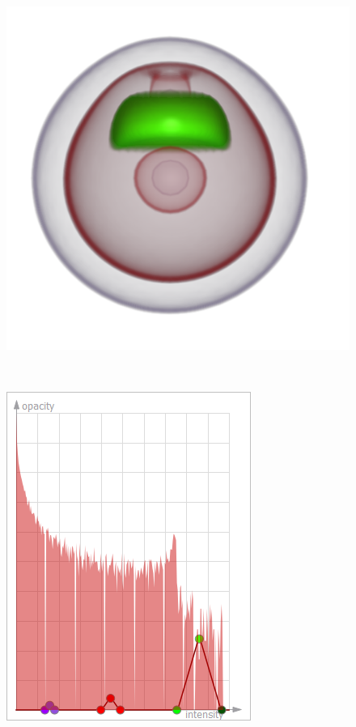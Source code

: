 \begin{figure}
	\centering
	\begin{minipage}{.3\textwidth}
		\includegraphics[width=1\linewidth]{images/nucleon_naive_optimized_linesearch}
		\subcaption{}
	\end{minipage}~
	\begin{minipage}{.15\textwidth}
		\includegraphics[width=1\linewidth]{images/tf_nucleon_naive_optimized_linesearch}

\end{minipage}
\end{figure}
